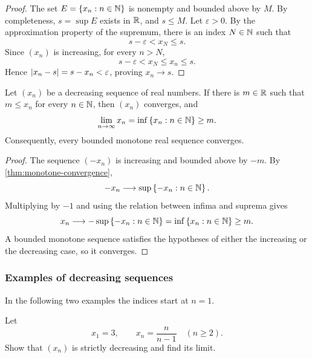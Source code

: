 \documentclass[11pt,a4paper]{amsart}
\begin{document}
\begin{proof}
  The set \(E=\left\lbrace x_n:n\in\mathbb{N}\right\rbrace\) is nonempty and bounded above by
  \(M\). By completeness, \(s=\sup E\) exists in \(\mathbb{R}\), and
  \(s\leq M\). Let \(\varepsilon>0\). By the approximation property of
  the supremum, there is an index \(N\in\mathbb{N}\) such that
  \[
    s-\varepsilon<x_N\leq s.
  \]
  Since \((x_n)\) is increasing, for every \(n>N\),
  \[
    s-\varepsilon<x_N\leq x_n\leq s.
  \]
  Hence \(\lvert x_n-s\rvert=s-x_n<\varepsilon\), proving \(x_n\to s\).
\end{proof}

\begin{corollary}\label{cor:decreasing-convergence}
  Let \((x_n)\) be a decreasing sequence of real numbers. If there is
  \(m\in\mathbb{R}\) such that \(m\leq x_n\) for every \(n\in\mathbb{N}\), then
  \((x_n)\) converges, and
  \[
    \lim_{n\to\infty}x_n=\inf\left\lbrace x_n:n\in\mathbb{N}\right\rbrace\geq m.
  \]
  Consequently, every bounded monotone real sequence converges.
\end{corollary}

\begin{proof}
  The sequence \((-x_n)\) is increasing and bounded above by \(-m\).
  By \cref{thm:monotone-convergence},
  \[
    -x_n\longrightarrow\sup\left\lbrace-x_n:n\in\mathbb{N}\right\rbrace.
  \]
  Multiplying by \(-1\) and using the relation between infima and
  suprema gives
  \[
    x_n\longrightarrow-\sup\left\lbrace-x_n:n\in\mathbb{N}\right\rbrace
    =\inf\left\lbrace x_n:n\in\mathbb{N}\right\rbrace\geq m.
  \]
  A bounded monotone sequence satisfies the hypotheses of either the
  increasing or the decreasing case, so it converges.
\end{proof}

\subsubsection{Examples of decreasing sequences}

In the following two examples the indices start at \(n=1\).

\begin{example}
  Let
  \[
    x_1=3,\qquad x_n=\frac{n}{n-1}\quad(n\geq2).
  \]
  Show that \((x_n)\) is strictly decreasing and find its limit.
\end{example}
\end{document}
